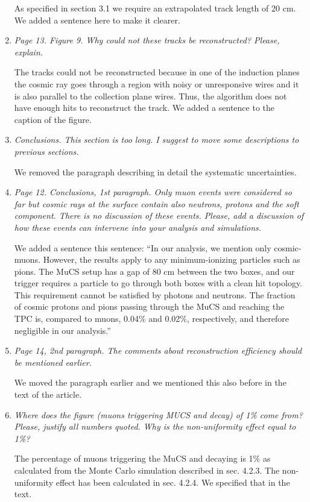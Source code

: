 \documentclass[review,number,sort&compress]{article}
\begin{document}
\begin{enumerate}
As specified in section 3.1 we require an extrapolated track length of 20 cm. We added a sentence here to make it clearer.

\item \emph{Page 13. Figure 9.
Why could not these tracks be reconstructed? Please, explain.}

The tracks could not be reconstructed because in one of the induction planes the cosmic ray goes through a region with noisy or unresponsive wires and it is also parallel to the collection plane wires. Thus, the algorithm does not have enough hits to reconstruct the track. We added a sentence to the caption of the figure.

\item \emph{Conclusions.
This section is too long. I suggest to move some descriptions to previous sections.}

We removed the paragraph describing in detail the systematic uncertainties.

\item \emph{Page 12. Conclusions, 1st paragraph.
Only muon events were considered so far but cosmic rays at the surface contain also neutrons, protons and the soft component. There is no discussion of these events. Please, add a discussion of how these events can intervene into your analysis and simulations.}

We added a sentence this sentence: ``In our analysis, we mention only cosmic-muons. However, the results apply to any minimum-ionizing particles such as pions. The MuCS setup has a gap of 80 cm between the two boxes, and our trigger requires a particle to go through both boxes with a clean hit topology. This requirement cannot be satisfied by photons and neutrons. The fraction of cosmic protons and pions passing through the MuCS and reaching the TPC is, compared to muons, 0.04\% and 0.02\%, respectively, and therefore negligible in our analysis.''

\item \emph{Page 14, 2nd paragraph.
The comments about reconstruction efficiency should be mentioned earlier.}

We moved the paragraph earlier and we mentioned this also before in the text of the article.

\item \emph{Where does the figure (muons triggering MUCS and decay) of 1\% come from? Please, justify all numbers quoted.
Why is the non-uniformity effect equal to 1\%?}

The percentage of muons triggering the MuCS and decaying is 1\% as calculated from the Monte Carlo simulation described in sec. 4.2.3. The non-uniformity effect has been calculated in sec. 4.2.4. We specified that in the text.

\end{enumerate}
\end{document}
